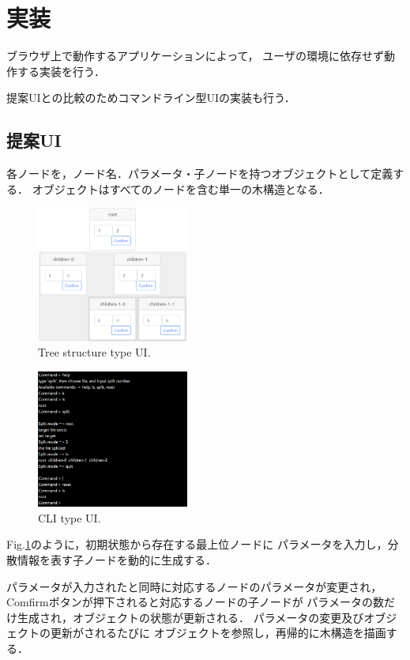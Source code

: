\documentclass[twocolumn, fleqn, uplatex]{jsarticle}
\begin{document}
\section{実装}
ブラウザ上で動作するアプリケーションによって，%
ユーザの環境に依存せず動作する実装を行う．

提案UIとの比較のためコマンドライン型UIの実装も行う．

\subsection{提案UI}
各ノードを，ノード名．パラメータ・子ノードを持つオブジェクトとして定義する．
オブジェクトはすべてのノードを含む単一の木構造となる．

\begin{figure}[htbp]
	\centering
	\includegraphics[width=5cm]{treeUI.png}
		\caption{Tree structure type UI.}
		\label{fig:treeUI}
\end{figure}

\begin{figure}[htbp]
	\centering
	\includegraphics[width=5cm]{cliUI.png}
		\caption{CLI type UI.}
		\label{fig:cliUI}
\end{figure}

Fig.\ref{fig:treeUI}のように，初期状態から存在する最上位ノードに%
パラメータを入力し，分散情報を表す子ノードを動的に生成する．

パラメータが入力されたと同時に対応するノードのパラメータが変更され，%
Comfirmボタンが押下されると対応するノードの子ノードが%
パラメータの数だけ生成され，オブジェクトの状態が更新される．%
パラメータの変更及びオブジェクトの更新がされるたびに%
オブジェクトを参照し，再帰的に木構造を描画する．
\end{document}
